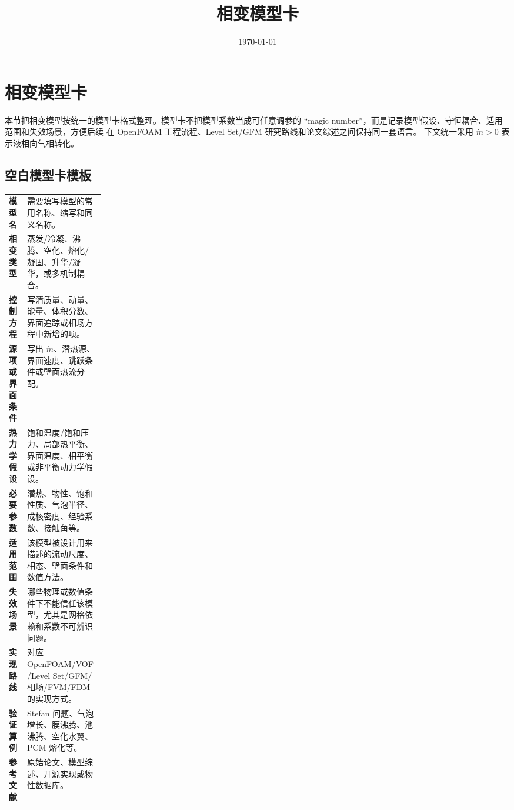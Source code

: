 \documentclass[UTF8,fontset=none]{ctexart}
\title{相变模型卡}
\author{}
\date{\today}
\begin{document}
\maketitle
\tableofcontents
\newpage

\section{相变模型卡}
\label{sec:phase-change-model-cards}

本节把相变模型按统一的模型卡格式整理。模型卡不把模型系数当成可任意调参的
``magic number''，而是记录模型假设、守恒耦合、适用范围和失效场景，方便后续
在 OpenFOAM 工程流程、Level Set/GFM 研究路线和论文综述之间保持同一套语言。
下文统一采用 $\dot{m}>0$ 表示液相向气相转化。

\subsection{空白模型卡模板}
\label{subsec:phase-change-card-template}

\begingroup
\small
\renewcommand{\arraystretch}{1.18}
\noindent\begin{tabularx}{\linewidth}{@{}>{\bfseries}p{0.19\linewidth}X@{}}
\toprule
模型名 & 需要填写模型的常用名称、缩写和同义名称。 \\
相变类型 & 蒸发/冷凝、沸腾、空化、熔化/凝固、升华/凝华，或多机制耦合。 \\
控制方程 & 写清质量、动量、能量、体积分数、界面追踪或相场方程中新增的项。 \\
源项或界面条件 & 写出 $\dot{m}$、潜热源、界面速度、跳跃条件或壁面热流分配。 \\
热力学假设 & 饱和温度/饱和压力、局部热平衡、界面温度、相平衡或非平衡动力学假设。 \\
必要参数 & 潜热、物性、饱和性质、气泡半径、成核密度、经验系数、接触角等。 \\
适用范围 & 该模型被设计用来描述的流动尺度、相态、壁面条件和数值方法。 \\
失效场景 & 哪些物理或数值条件下不能信任该模型，尤其是网格依赖和系数不可辨识问题。 \\
实现路线 & 对应 OpenFOAM/VOF/Level Set/GFM/相场/FVM/FDM 的实现方式。 \\
验证算例 & Stefan 问题、气泡增长、膜沸腾、池沸腾、空化水翼、PCM 熔化等。 \\
参考文献 & 原始论文、模型综述、开源实现或物性数据库。 \\
\bottomrule
\end{tabularx}
\endgroup
\end{document}
